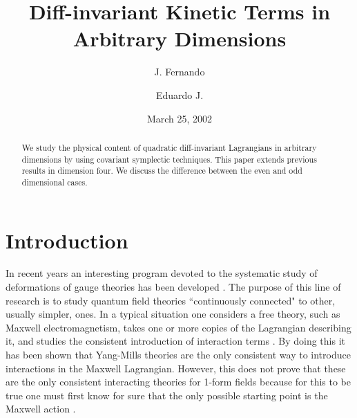 \documentclass[prd,a4paper,twocolumn,amssymb,amsmath,nofootinbib,showpacs]{revtex4}
\begin{document}
\title{Diff-invariant Kinetic Terms in Arbitrary Dimensions}

\author{J. Fernando }
\author{Eduardo J. }

\date{March 25, 2002}

\begin{abstract}
We study the physical content of quadratic diff-invariant
Lagrangians in arbitrary dimensions by using covariant symplectic
techniques. This paper extends previous results in dimension four.
We discuss the difference between the even and odd dimensional
cases.
\end{abstract}


\maketitle

\section{\label{Intro}Introduction}
In recent years an interesting program devoted to the systematic
study of deformations of gauge theories has been developed
\cite{Barnich:1994pa}. The purpose of this line of research is to
study quantum field theories ``continuously connected" to other,
usually simpler, ones. In a typical situation one considers a free
theory, such as Maxwell electromagnetism, takes one or more copies
of the Lagrangian describing it, and studies the consistent
introduction of interaction terms \cite{Barnich:1994pa}. By doing
this it has been shown \cite{Henneaux:1997bm} that Yang-Mills
theories are the only consistent way to introduce interactions in
the Maxwell Lagrangian. However, this does not prove that these
are the only consistent interacting theories for 1-form fields
because for this to be true one must first know for sure that the
only possible starting point is the Maxwell action
\cite{Barbero:2000sb}.
\end{document}
